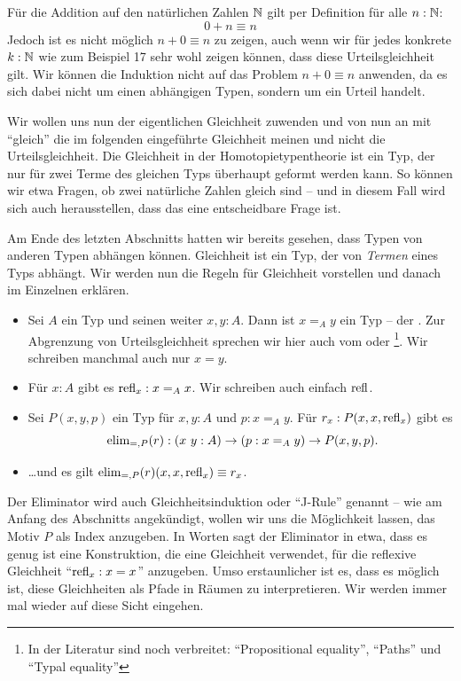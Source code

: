 Für die Addition auf den natürlichen Zahlen $\mathbb{N}$ gilt per Definition für alle $n:\mathbb{N}$:
\[
  0+n\equiv n
\]
Jedoch ist es nicht möglich $n+0\equiv n$ zu zeigen, auch wenn wir für jedes konkrete $k:\mathbb{N}$ wie zum Beispiel 17 sehr wohl zeigen können, dass diese Urteilsgleichheit gilt.
Wir können die Induktion nicht auf das Problem $n+0\equiv n$ anwenden, da es sich dabei nicht um einen abhängigen Typen, sondern um ein Urteil handelt.

Wir wollen uns nun der eigentlichen Gleichheit zuwenden und von nun an mit ``gleich'' die im folgenden eingeführte Gleichheit meinen und nicht die Urteilsgleichheit.
Die Gleichheit in der Homotopietypentheorie ist ein Typ, der nur für zwei Terme des gleichen Typs überhaupt geformt werden kann.
So können wir etwa Fragen, ob zwei natürliche Zahlen gleich sind -- und in diesem Fall wird sich auch herausstellen, dass das eine entscheidbare Frage ist.

Am Ende des letzten Abschnitts hatten wir bereits gesehen, dass Typen von anderen Typen abhängen können. Gleichheit ist ein Typ, der von \emph{Termen} eines Typs abhängt.
Wir werden nun die Regeln für Gleichheit vorstellen und danach im Einzelnen erklären.

\begin{regeln}
\begin{itemize}
\item Sei $A$ ein Typ und seinen weiter $x,y:A$. Dann ist $x=_Ay$ ein Typ -- der . Zur Abgrenzung von Urteilsgleichheit sprechen wir hier auch vom  oder \footnote{In der Literatur sind noch verbreitet: ``Propositional equality'', ``Paths'' und ``Typal equality''}. Wir schreiben manchmal auch nur $x=y$.
\item Für $x:A$ gibt es $\mathrm{refl}_x:x=_Ax$. Wir schreiben auch einfach $\mathrm{refl}$.
\item Sei $P(x,y, p)$ ein Typ für $x,y:A$ und $ p:x=_Ay$.
  Für $r_{x}:P(x,x,\mathrm{refl}_x)$ gibt es
  \[
    \elim_{=,P}(r):(x\ y : A) \to ( p : x=_Ay) \to P(x,y, p)\rlap{.}
  \]
\item \dots und es gilt $\mathrm{elim}_{=,P}(r)(x,x,\mathrm{refl}_x)\equiv r_x$.
\end{itemize}
\end{regeln}

Der Eliminator wird auch Gleichheitsinduktion oder ``J-Rule'' genannt -- wie am Anfang des Abschnitts angekündigt, wollen wir uns die Möglichkeit lassen, das Motiv $P$ als Index anzugeben.
In Worten sagt der Eliminator in etwa, dass es genug ist eine Konstruktion, die eine Gleichheit verwendet, für die reflexive Gleichheit ``$\mathrm{refl}_x:x=x$'' anzugeben.
Umso erstaunlicher ist es, dass es möglich ist, diese Gleichheiten als Pfade in Räumen zu interpretieren. Wir werden immer mal wieder auf diese Sicht eingehen.

